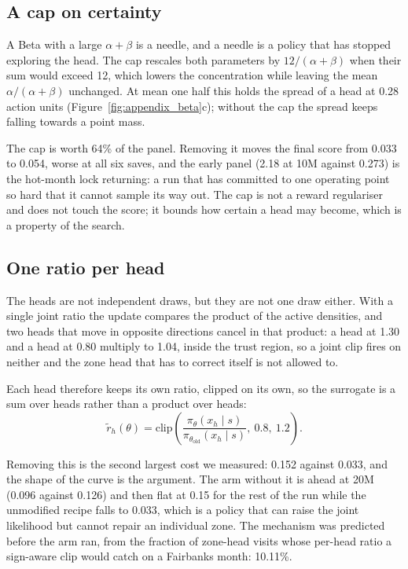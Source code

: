 \documentclass{article}
\begin{document}
\subsection{A cap on certainty}
\label{app:cap}

A Beta with a large $\alpha+\beta$ is a needle, and a needle is a policy that has stopped exploring the head. The cap rescales both parameters by $12/(\alpha+\beta)$ when their sum would exceed 12, which lowers the concentration while leaving the mean $\alpha/(\alpha+\beta)$ unchanged. At mean one half this holds the spread of a head at 0.28 action units (Figure~\ref{fig:appendix_beta}c); without the cap the spread keeps falling towards a point mass.

The cap is worth 64\% of the panel. Removing it moves the final score from 0.033 to 0.054, worse at all six saves, and the early panel (2.18 at 10M against 0.273) is the hot-month lock returning: a run that has committed to one operating point so hard that it cannot sample its way out. The cap is not a reward regulariser and does not touch the score; it bounds how certain a head may become, which is a property of the search.

\subsection{One ratio per head}
\label{app:ratio}

The heads are not independent draws, but they are not one draw either. With a single joint ratio the update compares the product of the active densities, and two heads that move in opposite directions cancel in that product: a head at 1.30 and a head at 0.80 multiply to 1.04, inside the trust region, so a joint clip fires on neither and the zone head that has to correct itself is not allowed to.

Each head therefore keeps its own ratio, clipped on its own, so the surrogate is a sum over heads rather than a product over heads:
\[
\tilde r_h(\theta) = \mathrm{clip}\!\left(\frac{\pi_\theta(x_h\mid s)}{\pi_{\theta_{\text{old}}}(x_h\mid s)},\ 0.8,\ 1.2\right).
\]

Removing this is the second largest cost we measured: 0.152 against 0.033, and the shape of the curve is the argument. The arm without it is ahead at 20M (0.096 against 0.126) and then flat at 0.15 for the rest of the run while the unmodified recipe falls to 0.033, which is a policy that can raise the joint likelihood but cannot repair an individual zone. The mechanism was predicted before the arm ran, from the fraction of zone-head visits whose per-head ratio a sign-aware clip would catch on a Fairbanks month: 10.11\%.
\end{document}
